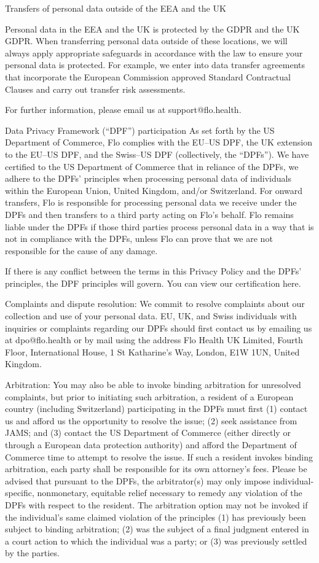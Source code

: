 Transfers of personal data outside of the EEA and the UK

Personal data in the EEA and the UK is protected by the GDPR and the UK GDPR. When transferring personal data outside of these locations, we will always apply appropriate safeguards in accordance with the law to ensure your personal data is protected. For example, we enter into data transfer agreements that incorporate the European Commission approved Standard Contractual Clauses and carry out transfer risk assessments.

For further information, please email us at support@flo.health.

Data Privacy Framework (“DPF”) participation
As set forth by the US Department of Commerce, Flo complies with the EU–US DPF, the UK extension to the EU–US DPF, and the Swiss–US DPF (collectively, the “DPFs”). We have certified to the US Department of Commerce that in reliance of the DPFs, we adhere to the DPFs’ principles when processing personal data of individuals within the European Union, United Kingdom, and/or Switzerland. For onward transfers, Flo is responsible for processing personal data we receive under the DPFs and then transfers to a third party acting on Flo’s behalf. Flo remains liable under the DPFs if those third parties process personal data in a way that is not in compliance with the DPFs, unless Flo can prove that we are not responsible for the cause of any damage.

If there is any conflict between the terms in this Privacy Policy and the DPFs’ principles, the DPF principles will govern. You can view our certification here.

Complaints and dispute resolution: We commit to resolve complaints about our collection and use of your personal data. EU, UK, and Swiss individuals with inquiries or complaints regarding our DPFs should first contact us by emailing us at dpo@flo.health or by mail using the address Flo Health UK Limited, Fourth Floor, International House, 1 St Katharine’s Way, London, E1W 1UN, United Kingdom. 

Arbitration: You may also be able to invoke binding arbitration for unresolved complaints, but prior to initiating such arbitration, a resident of a European country (including Switzerland) participating in the DPFs must first (1) contact us and afford us the opportunity to resolve the issue; (2) seek assistance from JAMS; and (3) contact the US Department of Commerce (either directly or through a European data protection authority) and afford the Department of Commerce time to attempt to resolve the issue. If such a resident invokes binding arbitration, each party shall be responsible for its own attorney’s fees. Please be advised that pursuant to the DPFs, the arbitrator(s) may only impose individual-specific, nonmonetary, equitable relief necessary to remedy any violation of the DPFs with respect to the resident. The arbitration option may not be invoked if the individual’s same claimed violation of the principles (1) has previously been subject to binding arbitration; (2) was the subject of a final judgment entered in a court action to which the individual was a party; or (3) was previously settled by the parties.

